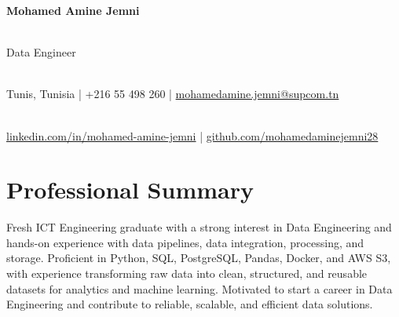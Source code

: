 \documentclass[10pt,letterpaper]{article}
\begin{document}
\RaggedRight


\begin{center}

    {\fontsize{22}{25}\selectfont
    \bfseries
    Mohamed Amine Jemni}

    \\[1.5pt]

    {\fontsize{11}{13}\selectfont
    \color{secondary}
    Data Engineer}

    \\[4pt]

    {\fontsize{9.4}{11.2}\selectfont
    Tunis, Tunisia
    \enspace|\enspace
    +216 55 498 260
    \enspace|\enspace
    \href{mailto:mohamedamine.jemni@supcom.tn}
    {mohamedamine.jemni@supcom.tn}}

    \\[2pt]

    {\fontsize{9.4}{11.2}\selectfont
    \href{https://linkedin.com/in/mohamed-amine-jemni}
    {linkedin.com/in/mohamed-amine-jemni}
    \enspace|\enspace
    \href{https://github.com/mohamedaminejemni28}
    {github.com/mohamedaminejemni28}}

\end{center}

\vspace{-10pt}


\section{Professional Summary}

Fresh ICT Engineering graduate with a strong interest in Data Engineering and hands-on experience with data pipelines, data integration, processing, and storage. Proficient in Python, SQL, PostgreSQL, Pandas, Docker, and AWS S3, with experience transforming raw data into clean, structured, and reusable datasets for analytics and machine learning. Motivated to start a career in Data Engineering and contribute to reliable, scalable, and efficient data solutions.

\end{document}
